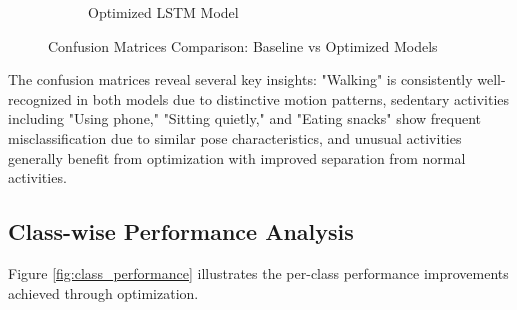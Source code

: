 \documentclass{iopconfser}
\begin{document}
\begin{figure}[H]
\begin{subfigure}{0.48\textwidth}
    \caption{Optimized LSTM Model}
    \label{fig:optimized_confusion}
\end{subfigure}
\caption{Confusion Matrices Comparison: Baseline vs Optimized Models}
\label{fig:confusion_matrices}
\end{figure}

The confusion matrices reveal several key insights: "Walking" is consistently well-recognized in both models due to distinctive motion patterns, sedentary activities including "Using phone," "Sitting quietly," and "Eating snacks" show frequent misclassification due to similar pose characteristics, and unusual activities generally benefit from optimization with improved separation from normal activities.

\subsection{Class-wise Performance Analysis}

Figure \ref{fig:class_performance} illustrates the per-class performance improvements achieved through optimization.
\end{document}
